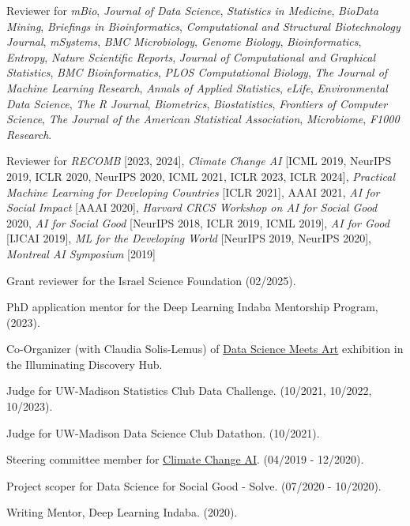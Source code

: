 \documentclass[letterpaper]{article}
\renewenvironment{itemize}{
  \begin{list}{}{
    \setlength{\leftmargin}{1.5em}
  }
}{
  \end{list}
}
\begin{document}
\begin{itemize}
\item Reviewer for \textit{mBio}, \textit{Journal of Data Science},
\textit{Statistics in Medicine}, \textit{BioData Mining}, \textit{Briefings in
Bioinformatics}, \textit{Computational and Structural Biotechnology Journal},
\textit{mSystems}, \textit{BMC Microbiology}, \textit{Genome Biology},
\textit{Bioinformatics}, \textit{Entropy}, \textit{Nature Scientific Reports},
\textit{Journal of Computational and Graphical Statistics}, \textit{BMC
Bioinformatics}, \textit{PLOS Computational Biology}, \textit{The Journal of
Machine Learning Research}, \textit{Annals of Applied Statistics},
\textit{eLife}, \textit{Environmental Data Science}, \textit{The R Journal},
\textit{Biometrics}, \textit{Biostatistics}, \textit{Frontiers of Computer
Science}, \textit{The Journal of the American Statistical Association},
\textit{Microbiome}, \textit{F1000 Research}.
\item Reviewer for \textit{RECOMB} [2023, 2024], \textit{Climate Change AI}
[ICML 2019, NeurIPS 2019, ICLR 2020, NeurIPS 2020, ICML 2021, ICLR 2023, ICLR
2024], \textit{Practical Machine Learning for Developing Countries} [ICLR 2021],
AAAI 2021, \textit{AI for Social Impact} [AAAI 2020], \textit{Harvard CRCS
Workshop on AI for Social Good} 2020, \textit{AI for Social Good} [NeurIPS 2018,
ICLR 2019, ICML 2019], \textit{AI for Good} [IJCAI 2019], \textit{ML for the
Developing World} [NeurIPS 2019, NeurIPS 2020], \textit{Montreal AI Symposium}
[2019]
\item Grant reviewer for the Israel Science Foundation (02/2025).
\item PhD application mentor for the Deep Learning Indaba Mentorship Program, (2023).
\item Co-Organizer (with Claudia Solis-Lemus) of
\href{https://illuminatingdiscovery.wisc.edu/technical-to-beautiful-data-as-art/}{Data Science Meets Art} exhibition in the Illuminating Discovery Hub.
\item Judge for UW-Madison Statistics Club Data Challenge. (10/2021, 10/2022, 10/2023).
\item Judge for UW-Madison Data Science Club Datathon. (10/2021).
\item Steering committee member for \href{https://www.climatechange.ai}{Climate
Change AI}. (04/2019 - 12/2020).
\item Project scoper for Data Science for Social Good - Solve. (07/2020 - 10/2020).
\item Writing Mentor, Deep Learning Indaba. (2020).

\end{itemize}
\end{document}
